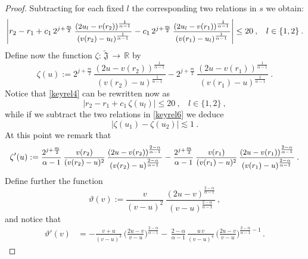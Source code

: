 \documentclass[a4paper,reqno]{amsart}
\numberwithin{equation}{section}
\theoremstyle{definition}
\newcommand{\R}{\mathbb{R}}
\newcommand{\sdfrac}[2]{\mbox{\small$\displaystyle\frac{#1}{#2}$}}
\def\beq{\begin{equation}}
\def\eeq{\end{equation}}
\def\beq{\begin{equation}}
\def\eeq{\end{equation}}
\def\a{\alpha}
\def\beq{\begin{equation}}
\def\eeq{\end{equation}}
\def\beq{\begin{equation}}
\def\eeq{\end{equation}}
\begin{document}
\begin{proof}
Subtracting for each fixed $l$ the corresponding two relations in $s$ we obtain:
\beq\label{keyrel4}
\left|r_2-r_1+ c_1\,2^{j+\frac{m}{2}}\,\sdfrac{(2u_l-v(r_2))^{\frac{1}{\a-1}}}{(v(r_2)-u_l)^{\frac{1}{\a-1}}}-
c_1\,2^{j+\frac{m}{2}}\,\sdfrac{(2u_l-v(r_1))^{\frac{1}{\a-1}}}{(v(r_1)-u_l)^{\frac{1}{\a-1}}}\right|\leq 20\:,\:\:\:\:l\in\{1,2\}\:.
\eeq
Define now the function $\zeta:\,\tilde{\mathfrak{J}}\,\longrightarrow\,\R$ by
\beq\label{keyrel5}
\zeta(u):=2^{j+\frac{m}{2}}\,\frac{(2u-v(r_2))^{\frac{1}{\a-1}}}{(v(r_2)-u)^{\frac{1}{\a-1}}}-
2^{j+\frac{m}{2}}\,\frac{(2u-v(r_1))^{\frac{1}{\a-1}}}{(v(r_1)-u)^{\frac{1}{\a-1}}}\:.
\eeq
Notice that \eqref{keyrel4} can be rewritten now as
\beq\label{keyrel6}
\left|r_2-r_1+ c_1\,\zeta(u_l)\right|\leq 20\:,\:\:\:\:l\in\{1,2\}\:,
\eeq
while if we subtract the two relations in \eqref{keyrel6} we deduce
\beq\label{keyrel7}
\left|\zeta(u_1)-\zeta(u_2)\right|\lesssim 1\:.
\eeq
At this point we remark that
\beq\label{keyrel8}
\zeta'(u):=\sdfrac{2^{j+\frac{m}{2}}}{\a-1}\,\sdfrac{v(r_2)}{(v(r_2)-u)^2}\,\sdfrac{(2u-v(r_2))^{\frac{2-\a}{\a-1}}}{(v(r_2)-u)^{\frac{2-\a}{\a-1}}}-
\sdfrac{2^{j+\frac{m}{2}}}{\a-1}\,\sdfrac{v(r_1)}{(v(r_1)-u)^2}\,\sdfrac{(2u-v(r_1))^{\frac{2-\a}{\a-1}}}{(v(r_1)-u)^{\frac{2-\a}{\a-1}}}\:.
\eeq
Define further the function
\beq\label{f1}
\vartheta(v):=\frac{v}{(v-u)^2}\,\frac{(2u-v)^{\frac{2-\a}{\a-1}}}{(v-u)^{\frac{2-\a}{\a-1}}}\,,
\eeq
and notice that
\begin{align}
\vartheta'(v)&=-\frac{v+u}{(v-u)^3}\,\Big(\frac{2u-v}{v-u}\Big)^{\frac{2-\a}{\a-1}}-\,\frac{2-\a}{\a-1}\, \frac{u\,v}{(v-u)^4}\, \Big(\frac{2u-v}{v-u}\Big)^{\frac{2-\a}{\a-1}-1}\,.\label{f3}
\end{align}


\end{proof}
\end{document}

